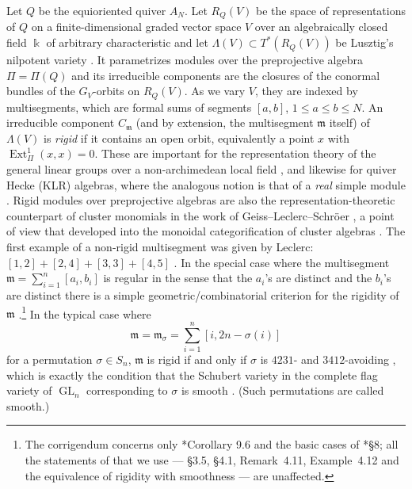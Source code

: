 \documentclass[12pt]{article}
\theoremstyle{definition}
\newcommand{\GL}{\operatorname{GL}}
\newcommand{\Ext}{\operatorname{Ext}}
\newcommand{\cmp}{C}                       %
\newcommand{\mm}{\mathfrak{m}}
\newcommand{\kk}{\Bbbk}
\begin{document}
Let $Q$ be the equioriented quiver $A_N$.
Let $R_Q(V)$ be the space of representations of $Q$ on a finite-dimensional graded vector space $V$ over an algebraically closed field $\kk$ of
arbitrary characteristic and let $\Lambda(V)\subset T^*(R_Q(V))$ be Lusztig's nilpotent variety \cite{MR1088333}.
It parametrizes modules over the preprojective algebra $\Pi=\Pi(Q)$ and its irreducible components are the closures of the conormal bundles of the $G_V$-orbits on $R_Q(V)$.
As we vary $V$, they are indexed by multisegments, which are formal sums of segments $[a,b]$, $1\le a\le b\le N$.
An irreducible component $\cmp_\mm$ (and by extension, the multisegment $\mm$ itself) of $\Lambda(V)$ is
\emph{rigid} if it contains an open orbit, equivalently a point $x$ with $\Ext^1_\Pi(x,x) = 0$.
These are important for the representation theory of the general linear groups over a non-archimedean local field \cites{MR584084,MR3866895,MR4847251},
and likewise for quiver Hecke (KLR) algebras, where the analogous notion is that of a \emph{real} simple module \cites{MR3314831,MR4016058}.
Rigid modules over preprojective algebras are also the representation-theoretic counterpart of cluster monomials in the work of Geiss--Leclerc--Schr\"oer
\cites{MR2242628,MR2822235}, a point of view that developed into the monoidal categorification of cluster algebras \cites{MR2682185,MR3758148,MR4094378}.
The first example of a non-rigid multisegment was given by Leclerc: $[1,2]+[2,4]+[3,3]+[4,5]$ \cite{MR1959765}.
In the special case where the multisegment $\mm=\sum_{i=1}^n[a_i,b_i]$ is regular in the sense that the $a_i$'s are distinct and the $b_i$'s are distinct
there is a simple geometric/combinatorial criterion for the rigidity of $\mm$ \cites{MR3866895,MR4757326}.\footnote{The corrigendum \cite{MR4757326}
concerns only \cite{MR3866895}*{Corollary 9.6} and the basic cases of \cite{MR3866895}*{\S8}; all the statements of \cite{MR3866895}
that we use --- \S3.5, \S4.1, Remark~4.11, Example~4.12 and the equivalence of rigidity with smoothness --- are unaffected.}
In the typical case where
\[
\mm=\mm_\sigma=\sum_{i=1}^n[i,2n-\sigma(i)]
\]
for a permutation $\sigma\in S_n$, $\mm$ is rigid if and only if $\sigma$ is $4231$- and $3412$-avoiding \cite{MR3866895}, which is exactly the condition that
the Schubert variety in the complete flag variety of $\GL_n$ corresponding to $\sigma$ is smooth \cite{MR1051089}. (Such permutations are called smooth.)
\end{document}

